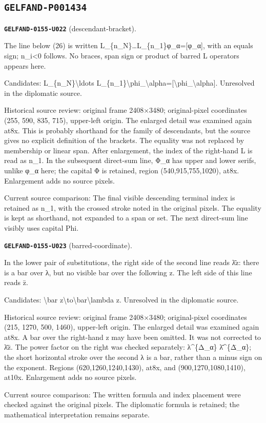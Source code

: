 \subsection*{\texttt{GELFAND-P001434}}
\par\noindent\leavevmode{}\label{GELFAND-0155-U022}\label{GELFAND-P001434:descendant-bracket}\textbf{\texttt{GELFAND-0155-U022}} (descendant-bracket).\nopagebreak[4]\par
The line below (26) is written L\_\{n\_N\}…L\_\{n\_1\}φ\_α=[φ\_α], with an equals sign; n\_i<0 follows. No braces, span sign or product of barred L operators appears here.\par
Candidates: L\_\{n\_N\}\textbackslash{}ldots L\_\{n\_1\}\textbackslash{}phi\_\textbackslash{}alpha=[\textbackslash{}phi\_\textbackslash{}alpha]. Unresolved in the diplomatic source.\par
Historical source review: original frame 2408×3480; original-pixel coordinates (255, 590, 835, 715), upper-left origin. The enlarged detail was examined again at8x. This is probably shorthand for the family of descendants, but the source gives no explicit definition of the brackets. The equality was not replaced by membership or linear span. After enlargement, the index of the right-hand L is read as n\_1. In the subsequent direct-sum line, Φ\_α has upper and lower serifs, unlike φ\_α here; the capital Φ is retained, region (540,915,755,1020), at8x. Enlargement adds no source pixels.\par
Current source comparison: The final visible descending terminal index is retained as n\_1, with the crossed stroke noted in the original pixels. The equality is kept as shorthand, not expanded to a span or set. The next direct-sum line visibly uses capital Phi.\par
\medskip
\par\noindent\leavevmode{}\label{GELFAND-0155-U023}\label{GELFAND-P001434:barred-coordinate}\textbf{\texttt{GELFAND-0155-U023}} (barred-coordinate).\nopagebreak[4]\par
In the lower pair of substitutions, the right side of the second line reads λ̄z: there is a bar over λ, but no visible bar over the following z. The left side of this line reads z̄.\par
Candidates: \textbackslash{}bar z\textbackslash{}to\textbackslash{}bar\textbackslash{}lambda z. Unresolved in the diplomatic source.\par
Historical source review: original frame 2408×3480; original-pixel coordinates (215, 1270, 500, 1460), upper-left origin. The enlarged detail was examined again at8x. A bar over the right-hand z may have been omitted. It was not corrected to λ̄z̄. The power factor on the right was checked separately: λ\textasciicircum{}\{Δ\_α\} λ̄\textasciicircum{}\{Δ̄\_α\}; the short horizontal stroke over the second λ is a bar, rather than a minus sign on the exponent. Regions (620,1260,1240,1430), at8x, and (900,1270,1080,1410), at10x. Enlargement adds no source pixels.\par
Current source comparison: The written formula and index placement were checked against the original pixels. The diplomatic formula is retained; the mathematical interpretation remains separate.\par
\medskip
